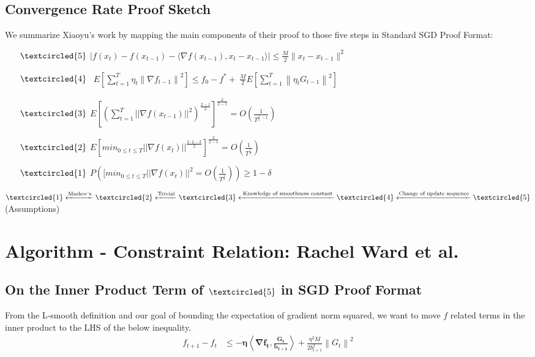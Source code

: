 \documentclass[14pt,onecolumn,letterpaper]{extarticle}
\begin{document}
\subsection{Convergence Rate Proof Sketch}
We summarize Xiaoyu's work
 by mapping the main components of their proof to those five steps in Standard SGD Proof Format:\\
\begin{enumerate}
    \item [$\textcircled{5}$] $|f(x_t)-f(x_{t-1})-\langle\nabla f(x_{t-1}), x_t-x_{t-1}\rangle| \leq \frac{M}{2}\|x_t-x_{t-1}\|^2$\\
    \item [$\textcircled{4}$] $\begin{aligned} E\left[\sum_{t=1}^T \eta_t\left\|\nabla f_{t-1}\right\|^2\right] \leq f_{0}-f^* +\ \frac{M}{2} 
    E\left[\sum_{t=1}^T\left\|\eta_t G_{t-1}\right\|^2\right]\end{aligned}$\\
    \item [$\textcircled{3}$] 
    $E\left[\left(\sum_{t=1}^{T}||\nabla f(x_{t-1})||^2\right)^{\frac{2-1}{2}}\right]^{\frac{2}{2-1}}
    = O(\frac{1}{T^{\frac{1}{2} - 1}})$
    \item [$\textcircled{2}$] $E[min_{0 \leq t \leq T}||\nabla f(x_t)||^{\frac{2\cdot 2-2}{2}}]^{\frac{2}{2-1}} = O(\frac{1}{T^{\frac{1}{2}}})$
    \item [$\textcircled{1}$] $P([min_{0 \leq t \leq T}||\nabla f(x_t)||^2 = O(\frac{1}{T^\frac{1
    }{2}})) \geq 1 - \delta$\\\par
\end{enumerate} \par
$\textcircled{1} \xleftarrow{\text{Markov's}} \textcircled{2} \xleftarrow{\text{Trivial}} \textcircled{3} \xleftarrow{\text{ Knowledge of smoothness constant}} \textcircled{4} \xleftarrow{\text{Change of update sequence}} \textcircled{5}$(Assumptions)
\section{Algorithm - Constraint Relation: Rachel Ward et al.}
\subsection{On the Inner Product Term of $\textcircled{5}$ in SGD Proof Format}
From the L-smooth definition and our goal of bounding the expectation of gradient norm squared, we want to move $f$ related terms in the inner product to the LHS of the below inequality.
    \begin{align*} f_{t+1}-f_t & \leq\boldsymbol{-\eta\left\langle\nabla f_t, \frac{G_t}{b_{t+1}}\right\rangle}+\frac{\eta^2 M}{2 b_{t+1}^2}\left\|G_t\right\|^2 \end{align*}
    
\end{document}
